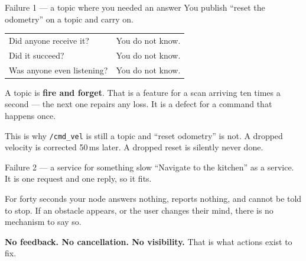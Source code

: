 \documentclass[aspectratio=169]{beamer}
\begin{document}
\begin{frame}{Failure 1 --- a topic where you needed an answer}
  \small
  You publish ``reset the odometry'' on a topic and carry on.

  \vspace{0.6em}
  \begin{center}
  \begin{tabular}{@{}ll@{}}
    \toprule
    Did anyone receive it? & You do not know. \\
    Did it succeed? & You do not know. \\
    Was anyone even listening? & You do not know. \\
    \bottomrule
  \end{tabular}
  \end{center}

  \vspace{0.8em}
  A topic is \textbf{fire and forget}. That is a feature for a scan arriving ten times a second
  --- the next one repairs any loss. It is a defect for a command that happens once.

  \vspace{0.5em}
  \begin{inthefield}
    \footnotesize
    This is why \texttt{/cmd\_vel} is still a topic and ``reset odometry'' is not. A dropped
    velocity is corrected 50\,ms later. A dropped reset is silently never done.
  \end{inthefield}
\end{frame}

\begin{frame}{Failure 2 --- a service for something slow}
  \small
  ``Navigate to the kitchen'' as a service. It is one request and one reply, so it fits.

  \vspace{0.6em}
  \begin{center}
  \end{center}

  \vspace{0.5em}
  For forty seconds your node answers nothing, reports nothing, and cannot be told to stop.
  If an obstacle appears, or the user changes their mind, there is no mechanism to say so.

  \vspace{0.4em}
  \textbf{No feedback. No cancellation. No visibility.} That is what actions exist to fix.
\end{frame}
\end{document}
